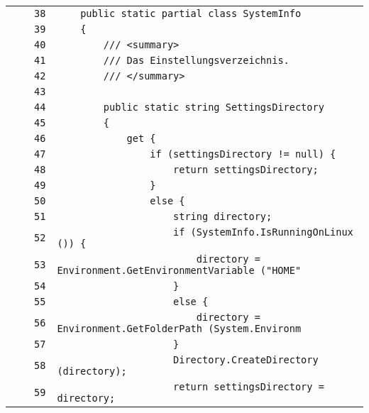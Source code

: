\documentclass[a4paper,10pt]{article}
\begin{document}
\begin{longtable}[l]{lrrl}
\cellcolor{gray} &  & \verb~38~ & \verb~    public static partial class SystemInfo~\\
\cellcolor{gray} &  & \verb~39~ & \verb~    {~\\
\cellcolor{gray} &  & \verb~40~ & \verb~        /// <summary>~\\
\cellcolor{gray} &  & \verb~41~ & \verb~        /// Das Einstellungsverzeichnis.~\\
\cellcolor{gray} &  & \verb~42~ & \verb~        /// </summary>~\\
\cellcolor{gray} &  & \verb~43~ & \verb~~\\
\cellcolor{gray} &  & \verb~44~ & \verb~        public static string SettingsDirectory~\\
\cellcolor{gray} &  & \verb~45~ & \verb~        {~\\
\cellcolor{gray} &  & \verb~46~ & \verb~            get {~\\
\cellcolor{gray} &  & \verb~47~ & \verb~                if (settingsDirectory != null) {~\\
\cellcolor{gray} &  & \verb~48~ & \verb~                    return settingsDirectory;~\\
\cellcolor{gray} &  & \verb~49~ & \verb~                }~\\
\cellcolor{gray} &  & \verb~50~ & \verb~                else {~\\
\cellcolor{gray} &  & \verb~51~ & \verb~                    string directory;~\\
\cellcolor{gray} &  & \verb~52~ & \verb~                    if (SystemInfo.IsRunningOnLinux ()) {~\\
\cellcolor{gray} &  & \verb~53~ & \verb~                        directory = Environment.GetEnvironmentVariable ("HOME"~\\
\cellcolor{gray} &  & \verb~54~ & \verb~                    }~\\
\cellcolor{gray} &  & \verb~55~ & \verb~                    else {~\\
\cellcolor{gray} &  & \verb~56~ & \verb~                        directory = Environment.GetFolderPath (System.Environm~\\
\cellcolor{gray} &  & \verb~57~ & \verb~                    }~\\
\cellcolor{gray} &  & \verb~58~ & \verb~                    Directory.CreateDirectory (directory);~\\
\cellcolor{gray} &  & \verb~59~ & \verb~                    return settingsDirectory = directory;~\\

\end{longtable}
\end{document}
